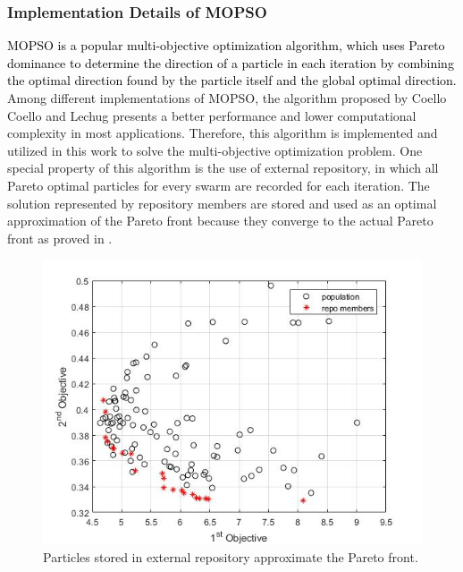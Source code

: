 \subsubsection{Implementation Details of MOPSO} %

\textcolor{black}{MOPSO is a popular multi-objective optimization algorithm, which uses Pareto dominance to determine the direction of a particle in each iteration by combining the optimal direction found by the particle itself and the global optimal direction.} Among different implementations of MOPSO, the algorithm proposed by Coello Coello and Lechug presents a better performance and lower computational complexity in most applications\cite{coello2002mopso}. Therefore, this algorithm is implemented and utilized in this work to solve the multi-objective optimization problem. One special property of this algorithm is the use of external repository, in which all Pareto optimal particles for every swarm are recorded for each iteration. The solution represented by repository members are stored and used as an optimal approximation of the Pareto front because they converge to the actual Pareto front as proved in \cite{coello2002mopso}. %

\begin{figure}[t]
	\centering
	\includegraphics[scale=.6]{Fig/repo_members.jpg}
	\caption{Particles stored in external repository approximate the Pareto front.}%
		\label{fig:repo_members}
	\end{figure}

